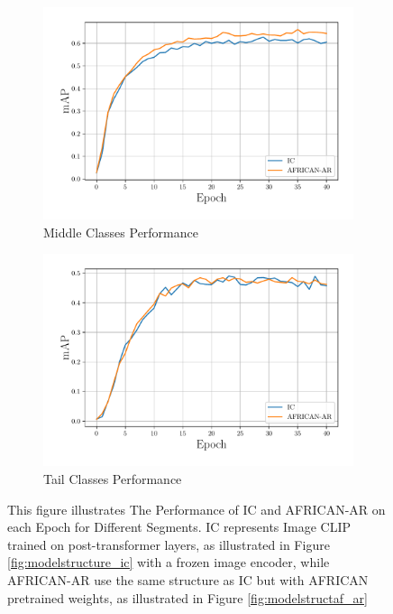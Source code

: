 \begin{figure}
\begin{adjustwidth}{-0.15\linewidth}{-0.07\linewidth}
    \vspace{10pt} %

    \begin{subfigure}[b]{0.65\textwidth}
        \includegraphics[width=\textwidth]{assets/charts/4_4_finalscore_2_middle}
        \caption{Middle Classes Performance}
        \label{fig:subfig3}
    \end{subfigure}
    \begin{subfigure}[b]{0.65\textwidth}
        \includegraphics[width=\textwidth]{assets/charts/4_4_finalscore_3_tail}
        \caption{Tail Classes Performance}
        \label{fig:subfig4}
    \end{subfigure}
    \caption[The Performance of IC and AFRICAN-AR on each Epoch for Different Segments]{This figure illustrates The Performance of IC and AFRICAN-AR on each Epoch for Different Segments. IC represents Image CLIP trained on post-transformer layers, as illustrated in Figure \ref{fig:modelstructure_ic} with a frozen image encoder, while AFRICAN-AR use the same structure as IC but with AFRICAN pretrained weights, as illustrated in Figure \ref{fig:modelstructaf_ar}}
    \label{fig:final_result}
    
\end{adjustwidth}
\end{figure}




